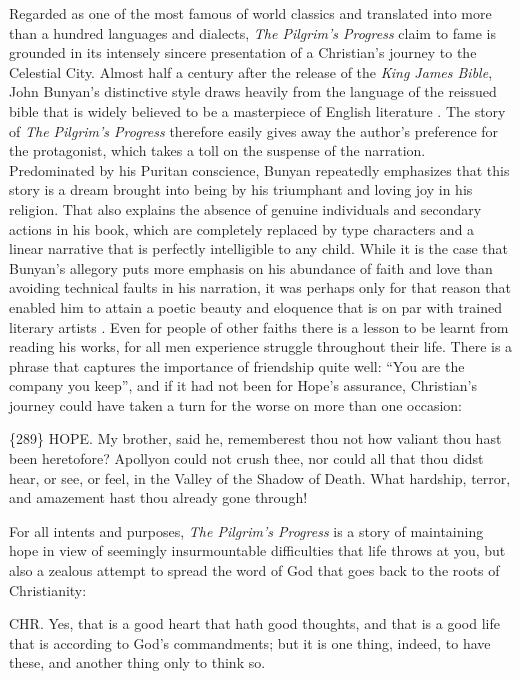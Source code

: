 Regarded as one of the most famous of world classics and translated into more 
than a hundred languages and dialects, \emph{The Pilgrim’s Progress} claim to 
fame is grounded in its intensely sincere presentation of a Christian’s journey 
to the Celestial City. Almost half a century after the release of the 
\emph{King James Bible}, John Bunyan’s distinctive style draws heavily from the 
language of the reissued bible that is widely believed to be a masterpiece 
of English literature \autocite[70]{fletcher2007}. The story of 
\emph{The Pilgrim’s Progress} therefore easily gives away the author’s 
preference for the protagonist, which takes a toll on the suspense of the 
narration. Predominated by his Puritan conscience, Bunyan repeatedly emphasizes 
that this story is a dream brought into being by his triumphant and loving joy 
in his religion. That also explains the absence of genuine individuals and 
secondary actions in his book, which are completely replaced by type characters 
and a linear narrative that is perfectly intelligible to any child. While it is 
the case that Bunyan’s allegory puts more emphasis on his abundance of faith and 
love than avoiding technical faults in his narration, it was perhaps only for 
that reason that enabled him to attain a poetic beauty and eloquence that is on 
par with trained literary artists \autocite[80]{fletcher2007}. Even for people 
of other faiths there is a lesson to be learnt from reading his works, for all 
men experience struggle throughout their life. There is a phrase that captures 
the importance of friendship quite well: “You are the company you keep”, and if 
it had not been for Hope’s assurance, Christian’s journey could have taken a 
turn for the worse on more than one occasion:

\begin{displayquote}
\{289\} HOPE. My brother, said he, rememberest thou not how valiant thou hast 
been heretofore? Apollyon could not crush thee, nor could all that thou didst 
hear, or see, or feel, in the Valley of the Shadow of Death. What hardship, 
terror, and amazement hast thou already gone through! 
\autocite[64]{bunyan2018}    
\end{displayquote}

For all intents and purposes, \emph{The Pilgrim’s Progress} is a story of 
maintaining hope in view of seemingly insurmountable difficulties that life 
throws at you, but also a zealous attempt to spread the word of God that goes 
back to the roots of Christianity:

\begin{displayquote}
CHR. Yes, that is a good heart that hath good thoughts, and that is a good life 
that is according to God’s commandments; but it is one thing, indeed, to have 
these, and another thing only to think so. \autocite[81]{bunyan2018}    
\end{displayquote}

